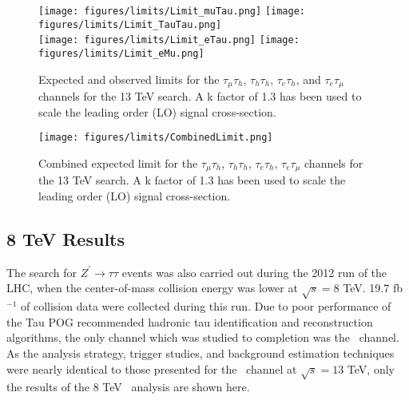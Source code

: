 
\begin{figure}[tbh!]
  \centering
  \texttt{[image: figures/limits/Limit\_muTau.png]}
  \texttt{[image: figures/limits/Limit\_TauTau.png]}\\
  \texttt{[image: figures/limits/Limit\_eTau.png]}
  \texttt{[image: figures/limits/Limit\_eMu.png]}
  \caption{Expected and observed limits for the $\tau_{\mu}\tau_{h}$, $\tau_{h}\tau_{h}$, $\tau_{e}\tau_{h}$, and $\tau_{e}\tau_{\mu}$ channels for the 13 TeV search. A k factor of 1.3 has been used to scale the leading order (LO) signal cross-section.} 
    \label{fig:Limits}
\end{figure}

\begin{figure}[tbh!]
  \centering
  \texttt{[image: figures/limits/CombinedLimit.png]}
  \caption{Combined expected limit for the $\tau_{\mu}\tau_{h}$, $\tau_{h}\tau_{h}$, $\tau_{e}\tau_{h}$, $\tau_{e}\tau_{\mu}$ channels for the 13 TeV search. A k factor of 1.3 has been used to scale the leading order (LO) signal cross-section.}
  \label{fig:CombinedLimits}
\end{figure}



\subsection{8 TeV Results}

The search for $Z^{\prime}\to\tau\tau$ events was also carried out during the 2012 run of the LHC, when the center-of-mass collision energy was lower at $\sqrt{s} = 8$ TeV. 19.7 fb$^{-1}$ of collision data were collected during this run. Due to poor performance of the Tau POG recommended hadronic tau identification and reconstruction algorithms, the only channel which was studied to completion was the \emu ~channel. As the analysis strategy, trigger studies, and background estimation techniques were nearly identical to those presented for the \emu ~channel at $\sqrt{s} = 13$ TeV, only the results of the 8 TeV \emu ~analysis are shown here.

